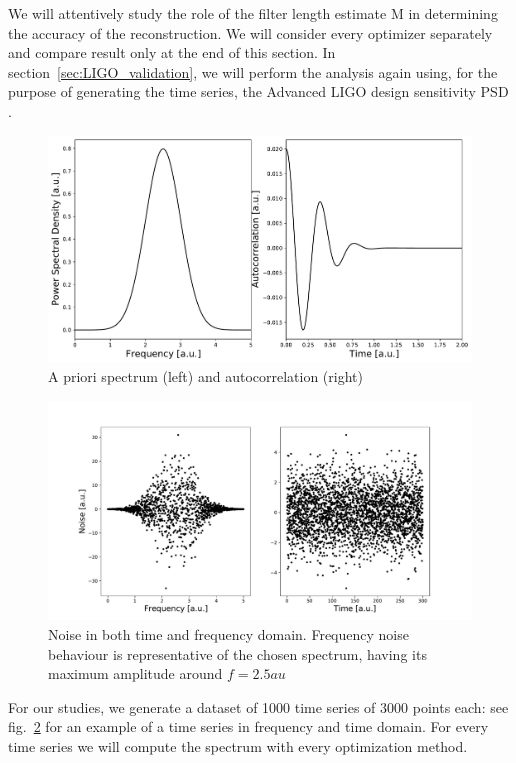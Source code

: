 \documentclass[twocolumn,showpacs,preprintnumbers,nofootinbib,prd,
superscriptaddress,10pt]{revtex4-1}
\begin{document}
We will attentively study the role of the filter length estimate M in determining the accuracy of the reconstruction. We will consider every optimizer separately and compare result only at the end of this section.
In section~\ref{sec:LIGO_validation}, we will perform the analysis again using, for the purpose of generating the time series, the Advanced LIGO design sensitivity PSD \cite{Ligo}.

\begin{figure}
	\centering
	\includegraphics[width = \linewidth]{Images/Noise and PSD/NormalPSDautocorr.pdf}
	\caption{A priori spectrum (left) and autocorrelation (right)}
	\label{fig:autocorr}
\end{figure}

\begin{figure}
    \centering
        \includegraphics[width = \linewidth]{Images/NormalPSD/NormalNoise.pdf}
    \caption{Noise in both time and frequency domain. Frequency noise behaviour is representative of the chosen spectrum, having its maximum amplitude around $f = 2.5 au$}
    \label{fig:noise}
\end{figure}

For our studies, we generate a dataset of 1000 time series of 3000 points each: see fig.~\ref{fig:noise} for an example of a time series in frequency and time domain.
For every time series we will compute the spectrum with every optimization method.
\end{document}
